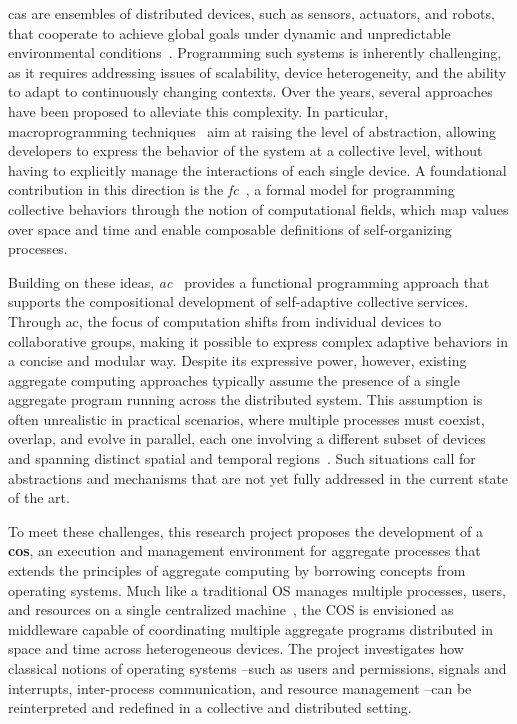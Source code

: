 \documentclass[runningheads]{llncs}
\begin{document}
    \ac{cas} are ensembles of distributed devices, such as sensors, actuators, and robots,
    that cooperate to achieve global goals under dynamic and unpredictable environmental conditions~\cite{DBLP:conf/huc/Ferscha15}.
    Programming such systems is inherently challenging,
    as it requires addressing issues of scalability, device heterogeneity,
    and the ability to adapt to continuously changing contexts.
    Over the years,
    several approaches have been proposed to alleviate this complexity.
    In particular,
    macroprogramming techniques~\cite{casadei22} aim at raising the level of abstraction,
    allowing developers to express the behavior of the system at a collective level,
    without having to explicitly manage the interactions of each single device.
    A foundational contribution in this direction is the \emph{\ac{fc}}~\cite{JLAMP2019,TOCL2019},
    a formal model for programming collective behaviors through the notion of computational fields,
    which map values over space and time and enable composable definitions of self-organizing processes.

    Building on these ideas,
    \emph{\ac{ac}}~\cite{BealIEEEComputer2015} provides a functional programming approach that supports the compositional development of self-adaptive collective services.
    Through \ac{ac},
    the focus of computation shifts from individual devices to collaborative groups,
    making it possible to express complex adaptive behaviors in a concise and modular way.
    Despite its expressive power,
    however,
    existing aggregate computing approaches typically assume the presence of a single aggregate program running across the distributed system.
    This assumption is often unrealistic in practical scenarios,
    where multiple processes must coexist,
    overlap,
    and evolve in parallel,
    each one involving a different subset of devices and spanning distinct spatial and temporal regions~\cite{EAAI2020-processes}.
    Such situations call for abstractions and mechanisms that are not yet fully addressed in the current state of the art.

    To meet these challenges,
    this research project proposes the development of a \textbf{\ac{cos}},
    an execution and management environment for aggregate processes that extends the principles of aggregate computing by borrowing concepts from operating systems.
    Much like a traditional OS manages multiple processes, users,
    and resources on a single centralized machine~\cite{DBLP:journals/csur/TanenbaumR85},
    the COS is envisioned as middleware capable of coordinating multiple aggregate programs distributed in space and time across heterogeneous devices.
    The project investigates how classical notions of operating systems --such as users and permissions, signals and interrupts,
    inter-process communication, and resource management --can be reinterpreted and redefined in a collective and distributed setting.
\end{document}
